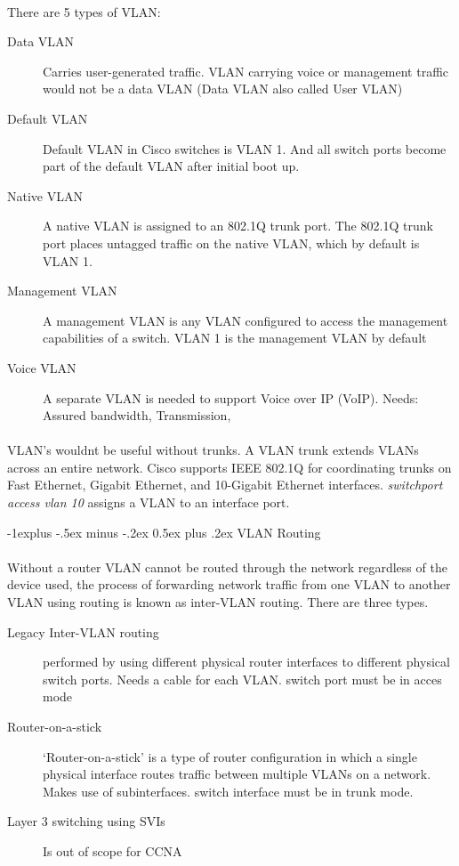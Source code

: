 \documentclass[10pt,landscape]{article}
\makeatletter
\renewcommand{\subsection}{\@startsection{subsection}{2}{0mm}%
                                {-1explus -.5ex minus -.2ex}%
                                {0.5ex plus .2ex}%
                                {\normalfont\normalsize\bfseries}}
\makeatother
\begin{document}
\begin{multicols}{3}
\paragraph{}
There are 5 types of VLAN:
\begin{description}
	\item[Data VLAN] Carries user-generated traffic. VLAN carrying voice or management traffic would not be a data VLAN (Data VLAN also called User VLAN)
	\item[Default VLAN] Default VLAN in Cisco switches is VLAN 1. And all switch ports become part of the default VLAN after initial boot up.
	\item[Native VLAN] A native VLAN is assigned to an 802.1Q trunk port. The 802.1Q trunk port places untagged traffic on the native VLAN, which by default is VLAN 1.
	\item[Management VLAN] A management VLAN is any VLAN configured to access the management capabilities of a switch. VLAN 1 is the management VLAN by default
	\item[Voice VLAN] A separate VLAN is needed to support Voice over IP (VoIP). Needs: Assured bandwidth, Transmission,
\end{description}
\paragraph{}
VLAN's wouldnt be useful without trunks. A VLAN trunk extends VLANs across an entire network. Cisco supports IEEE 802.1Q for coordinating trunks on Fast Ethernet, Gigabit Ethernet, and 10-Gigabit Ethernet interfaces.
\textit{switchport access vlan 10 } assigns a VLAN to an interface port.

\subsection{VLAN Routing}
\paragraph{}
Without a router VLAN cannot be routed through the network regardless of the device used, the process of forwarding network traffic from one VLAN to another VLAN using routing is known as inter-VLAN routing. There are three types.
\begin{description}
	\item[Legacy Inter-VLAN routing] performed by using different physical router interfaces to different physical switch ports. Needs a cable for each VLAN. switch port must be in acces mode
	\item[Router-on-a-stick] ‘Router-on-a-stick’ is a type of router configuration in which a single physical interface routes traffic between multiple VLANs on a network. Makes use of subinterfaces. switch interface must be in trunk mode.
	\item[Layer 3 switching using SVIs] Is out of scope for CCNA
\end{description}


\end{multicols}
\end{document}
